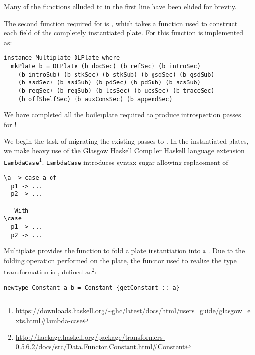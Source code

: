 Many of the functions alluded to in the first line have been elided for brevity.

The second function required for  is , which takes a function used to construct each field of the completely instantiated plate. For  this function is implemented as:

\begin{tcolorbox}
\begin{verbatim}
instance Multiplate DLPlate where
  mkPlate b = DLPlate (b docSec) (b refSec) (b introSec)
    (b introSub) (b stkSec) (b stkSub) (b gsdSec) (b gsdSub)
    (b ssdSec) (b ssdSub) (b pdSec) (b pdSub) (b scsSub)
    (b reqSec) (b reqSub) (b lcsSec) (b ucsSec) (b traceSec)
    (b offShelfSec) (b auxConsSec) (b appendSec)
\end{verbatim}
\end{tcolorbox}

We have completed all the boilerplate required to produce introspection passes for !

We begin the task of migrating the existing passes to . In the instantiated plates, we make heavy use of the Glasgow Haskell Compiler Haskell language extension \texttt{LambdaCase}\footnote{\url{https://downloads.haskell.org/~ghc/latest/docs/html/users_guide/glasgow_exts.html\#lambda-case}}. \texttt{LambdaCase} introduces syntax sugar allowing replacement of

\begin{tcolorbox}
\begin{verbatim}
\a -> case a of
  p1 -> ...
  p2 -> ...

-- With
\case 
  p1 -> ...
  p2 -> ...
\end{verbatim}
\end{tcolorbox}

Multiplate provides the function  to fold a plate instantiation into a . Due to the folding operation performed on the plate, the functor used to realize the type transformation is , defined as\footnote{\url{http://hackage.haskell.org/package/transformers-0.5.6.2/docs/src/Data.Functor.Constant.html\#Constant}}:

\begin{tcolorbox}
\begin{verbatim}
newtype Constant a b = Constant {getConstant :: a}
\end{verbatim}
\end{tcolorbox}

